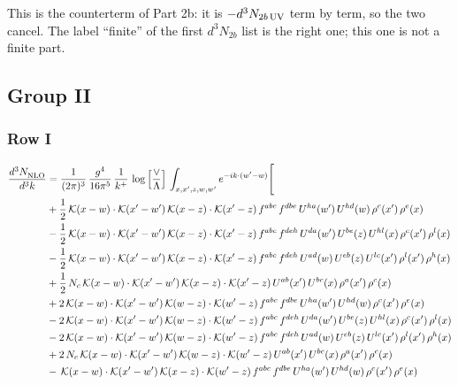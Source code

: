 \documentclass[9pt]{article}
\numberwithin{equation}{section}
\newcommand{\new}[1]{{\color{blue}#1}}
\begin{document}
\new{This is the counterterm of Part 2b: it is $-d^{3}N_{2b\,\rm UV}$ term by term, so the two cancel. The label ``finite'' of the first $d^3N_{2b}$ list is the right one; this one is not a finite part.}
\subsection{Group II}
\subsubsection{Row I}
\begin{align}
 \frac{d^{3}N_{\rm NLO}^{\rm}}{d^{3}k}  & = \frac{1}{(2\pi)^{3}}\,\frac{g^{4}}{16\pi^{5}}\,\frac{1}{k^{+}}\,\log{\left[\frac{\vee}{\Lambda}\right]}\,\int_{x,x',z,w,w'}e^{-ik\cdot(w'-w)}\Bigg[\notag\\
&+\frac{1}{2}\,\mathcal{K}(x-w)\cdot\mathcal{K}(x'-w')\,\mathcal{K}(x-z)\cdot\mathcal{K}(x'-z)\,f^{abc}\,f^{dbe}\,U^{ha}(w')\,U^{hd}(w)\,\rho^{c}(x')\,\rho^{e}(x)\notag\\
&-\frac{1}{2}\,\mathcal{K}(x-w)\cdot\mathcal{K}(x'-w')\,\mathcal{K}(x-z)\cdot\mathcal{K}(x'-z)\,f^{abc}\,f^{deh}\,U^{da}(w')\,U^{be}(z)\,U^{hl}(x)\,\rho^{c}(x')\,\rho^{l}(x)\notag\\
&-\frac{1}{2}\,\mathcal{K}(x-w)\cdot\mathcal{K}(x'-w')\,\mathcal{K}(x-z)\cdot\mathcal{K}(x'-z)\,f^{abc}\,f^{deh}\,U^{ad}(w)\,U^{eb}(z)\,U^{lc}(x')\,\rho^{l}(x')\,\rho^{h}(x)\notag\\
&+\frac{1}{2}\,N_{c}\,\mathcal{K}(x-w)\cdot\mathcal{K}(x'-w')\,\mathcal{K}(x-z)\cdot\mathcal{K}(x'-z)\,U^{ab}(x')\,U^{bc}(x)\,\rho^{a}(x')\,\rho^{c}(x)\notag\\
&+2\,\mathcal{K}(x-w)\cdot\mathcal{K}(x'-w')\,\mathcal{K}(w-z)\cdot\mathcal{K}(w'-z)\,f^{abc}\,f^{dbe}\,U^{ha}(w')\,U^{hd}(w)\,\rho^{c}(x')\,\rho^{e}(x)\notag\\
&-2\,\mathcal{K}(x-w)\cdot\mathcal{K}(x'-w')\,\mathcal{K}(w-z)\cdot\mathcal{K}(w'-z)\,f^{abc}\,f^{deh}\,U^{da}(w')\,U^{be}(z)\,U^{hl}(x)\,\rho^{c}(x')\,\rho^{l}(x)\notag\\
&-2\,\mathcal{K}(x-w)\cdot\mathcal{K}(x'-w')\,\mathcal{K}(w-z)\cdot\mathcal{K}(w'-z)\,f^{abc}\,f^{deh}\,U^{ad}(w)\,U^{eb}(z)\,U^{lc}(x')\,\rho^{l}(x')\,\rho^{h}(x)\notag\\
&+2\,N_{c}\,\mathcal{K}(x-w)\cdot\mathcal{K}(x'-w')\,\mathcal{K}(w-z)\cdot\mathcal{K}(w'-z)\,U^{ab}(x')\,U^{bc}(x)\,\rho^{a}(x')\,\rho^{c}(x)\notag\\
&-\,\mathcal{K}(x-w)\cdot\mathcal{K}(x'-w')\,\mathcal{K}(x-z)\cdot\mathcal{K}(w'-z)\,f^{abc}\,f^{dbe}\,U^{ha}(w')\,U^{hd}(w)\,\rho^{c}(x')\,\rho^{e}(x)\notag\\

\end{align}
\end{document}
